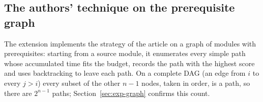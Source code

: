 \subsection{The authors' technique on the prerequisite graph}

The extension  implements the strategy of the article on a graph of modules with prerequisites: starting from a source module, it enumerates every simple path whose accumulated time fits the budget, records the path with the highest score and uses backtracking to leave each path. On a complete DAG (an edge from $i$ to every $j>i$) every subset of the other $n-1$ nodes, taken in order, is a path, so there are $2^{n-1}$ paths; Section~\ref{sec:exp-graph} confirms this count.
